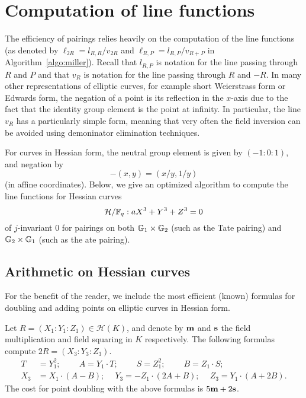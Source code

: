 \section{Computation of line functions}
\label{sec:lines}

The efficiency of pairings relies heavily on the computation of the line functions
(as denoted by $\ell_{2R} = l_{R,R}/v_{2R}$ and $\ell_{R,P} = l_{R,P}/v_{R+P}$ in Algorithm~\ref{algo:miller}).
Recall that $l_{R,P}$ is notation for the line passing through $R$ and $P$ and that
$v_{R}$ is notation for the line passing through $R$ and $-R$.
In many other representations of elliptic curves, for example short Weierstrass form or
Edwards form, the negation of a point is its reflection in the $x$-axis
due to the fact that the identity group element is the point at infinity.
In particular, the line $v_R$ has a particularly simple form, meaning that very often
the field inversion can be avoided using demoninator elimination techniques.

For curves in Hessian form, the neutral group element is given by $(-1:0:1)$,
and negation by
\[-(x,y) = (x/y,1/y)\]
(in affine coordinates).
Below, we give an optimized algorithm to compute the line functions for
Hessian curves 
\[\mathcal{H}/\mathbb{F}_{q}: aX^3 + Y^3 + Z^3 = 0\]
of $j$-invariant 0 
for pairings on both $\mathbb{G}_{1} \times \mathbb{G}_{2}$ (such as the Tate pairing)
and $\mathbb{G}_{2} \times \mathbb{G}_{1}$ (such as the ate pairing).

\subsection{Arithmetic on Hessian curves}

For the benefit of the reader, we include the most efficient (known) formulas
for doubling and adding points on elliptic curves in Hessian form.

Let $R = (X_1 : Y_1 : Z_1) \in \mathcal{H}(K)$, 
and denote by $\textbf{m}$ and $\textbf{s}$ 
the field multiplication and field squaring in $K$ respectively.
The following formulas compute $2R = (X_3 : Y_3 : Z_3)$.
\begin{align*}
T &= Y_1^2;\	\qquad	A = Y_1 \cdot T;\	\qquad
S = Z_1 ^ 2;\	\qquad	B = Z_1 \cdot S;\\
X_3 &= X_1 \cdot (A - B);\	\quad
Y_3 = -Z_1 \cdot (2A + B);\	\quad
Z_3 = Y_1 \cdot (A + 2B).
\end{align*}
The cost for point doubling with the above formulas is $5\textbf{m} + 2\textbf{s}$. 

